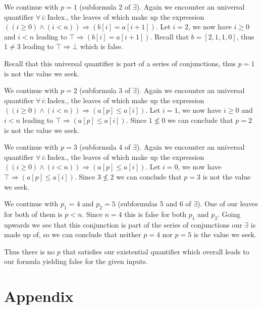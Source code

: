 \documentclass{article}
\begin{document}
We continue with $p = 1$ (subformula 2 of $\exists$). Again we encounter an universal quantifier $\forall\, i:\text{Index.}$, the leaves of which make up the expression $((i \geq 0) \land (i < n)) \Rightarrow (b[i] = a[i + 1])$. Let $i = 2$, we now have $i \geq 0$ and $i < n$ leading to $\top \Rightarrow (b[i] = a[i + 1])$. Recall that $b = [ 2, 1, 1, 0 ]$, thus $1 \neq 3$ leading to $\top \Rightarrow \bot$ which is false.

Recall that this universal quantifier is part of a series of conjunctions, thus $p = 1$ is not the value we seek.

We continue with $p = 2$ (subformula 3 of $\exists$). Again we encounter an universal quantifier $\forall\, i:\text{Index.}$, the leaves of which make up the expression $((i \geq 0) \land (i < n)) \Rightarrow (a[p] \leq a[i])$. Let $i = 1$, we now have $i \geq 0$ and $i < n$ leading to $\top \Rightarrow (a[p] \leq a[i])$. Since $1 \nleq 0$ we can conclude that $p = 2$ is not the value we seek.

We continue with $p = 3$ (subformula 4 of $\exists$). Again we encounter an universal quantifier $\forall\, i:\text{Index.}$, the leaves of which make up the expression $((i \geq 0) \land (i < n)) \Rightarrow (a[p] \leq a[i])$. Let $i = 0$, we now have $\top \Rightarrow (a[p] \leq a[i])$. Since $3 \nleq 2$ we can conclude that $p = 3$ is not the value we seek.

We continue with $p_1 = 4$ and $p_2 = 5$ (subformulas 5 and 6 of $\exists$). One of our leaves for both of them is $p < n$. Since $n = 4$ this is false for both $p_1$ and $p_2$. Going upwards we see that this conjunction is part of the series of conjunctions our $\exists$ is made up of, so we can conclude that neither $p = 4$ nor $p = 5$ is the value we seek.

Thus there is no $p$ that satisfies our existential quantifier which overall leads to our formula yielding false for the given inputs.

\pagebreak
\section{Appendix}
\label{sec:appendix}
\end{document}
